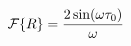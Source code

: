 \documentclass[preview]{standalone}
\begin{document}
\begin{align*}
\special{dvisvgm:raw <g id='unique000'>}\mathcal{F}\{R\} = \frac{2\sin(\omega\tau_0)}{\omega}\special{dvisvgm:raw </g>}
\end{align*}
\end{document}

